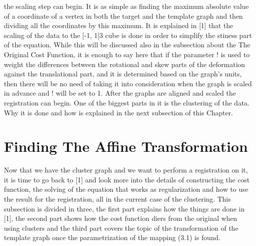 \documentclass[../structure.tex]{subfiles}
\begin{document}
the scaling step can begin. It is as simple as finding the maximum absolute
value of a coordinate of a vertex in both the target and the template graph
and then dividing all the coordinates by this maximum.
It is explained in [1] that the scaling of the data to the [-1, 1]3 cube is
done in order to simplify the stiness part of the equation. While this will
be discussed also in the subsection about the The Original Cost Function,
it is enough to say here that if the parameter ! is used to weight the differences
between the rotational and skew parts of the deformation against
the translational part, and it is determined based on the graph’s units, then
there will be no need of taking it into consideration when the graph is scaled
in advance and ! will be set to 1.
After the graphs are aligned and scaled the registration can begin. One
of the biggest parts in it is the clustering of the data. Why it is done and
how is explained in the next subsection of this Chapter.
\section{Finding The Affine Transformation}
Now that we have the cluster graph and we want to perform a registration on
it, it is time to go back to [1] and look more into the details of constructing
the cost function, the solving of the equation that works as regularization
and how to use the result for the registration, all in the current case of the
clustering. This subsection is divided in three, the first part explains how
the things are done in [1], the second part shows how the cost function diers
from the original when using clusters and the third part covers the topic of
the transformation of the template graph once the parametrization of the
mapping (3.1) is found.
\end{document}
